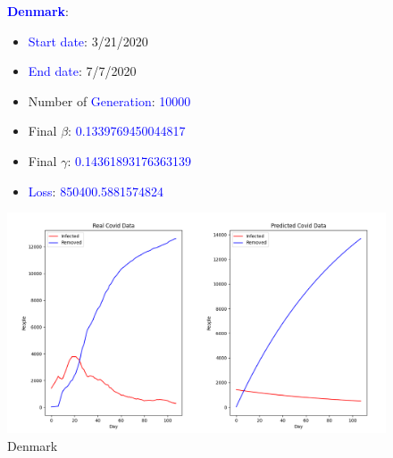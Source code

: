 \documentclass[a4paper]{article}
\begin{document}
    \begin{figure}[ht]
    \centering
    \textbf{\textcolor{blue}{Denmark}}: 
    \begin{itemize}
        \item \textcolor{blue}{Start date}: 3/21/2020
        \item \textcolor{blue}{End date}: 7/7/2020
        \item Number of \textcolor{blue}{Generation}: \textcolor{blue}{10000}
        \item Final $\beta$: \textcolor{blue}{0.1339769450044817}
        \item Final $\gamma$: \textcolor{blue}{0.14361893176363139}
        \item \textcolor{blue}{Loss}: \textcolor{blue}{850400.5881574824}
    \end{itemize}
    
    \includegraphics[width= \linewidth]{ex5-plot/Denmark.png}
    
    \caption{Denmark}
    \end{figure}
    
\end{document}
